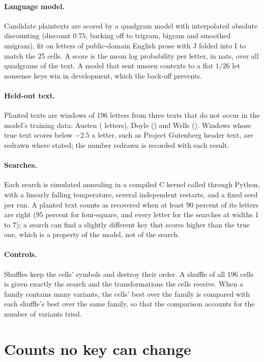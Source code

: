\documentclass[11pt]{article}
\theoremstyle{definition}
\begin{document}
\paragraph{Language model.} Candidate plaintexts are scored by a quadgram model with interpolated absolute discounting \cite{ney1994} (discount $0.75$, backing off to trigram, bigram and smoothed unigram), fit on \corpusLetters{} letters of public-domain English prose with J folded into I to match the 25 cells. A score is the mean log probability per letter, in nats, over all quadgrams of the text. A model that sent unseen contexts to a flat $1/26$ let nonsense keys win in development, which the back-off prevents.

\paragraph{Held-out text.} Planted texts are windows of 196 letters from three texts that do not occur in the model's training data: Austen (\heldAusten{} letters), Doyle (\heldDoyle{}) and Wells (\heldWells{}). Windows whose true text scores below $-2.5$ a letter, such as Project Gutenberg header text, are redrawn where stated; the number redrawn is recorded with each result.

\paragraph{Searches.} Each search is simulated annealing \cite{kirkpatrick1983} in a compiled C kernel called through Python, with a linearly falling temperature, several independent restarts, and a fixed seed per run. A planted text counts as recovered when at least 90 percent of its letters are right (95 percent for four-square, and every letter for the searches at widths 1 to 7); a search can find a slightly different key that scores higher than the true one, which is a property of the model, not of the search.

\paragraph{Controls.} Shuffles keep the cells' symbols and destroy their order. A shuffle of all 196 cells is given exactly the search and the transformations the cells receive. When a family contains many variants, the cells' best over the family is compared with each shuffle's best over the same family, so that the comparison accounts for the number of variants tried.

\section{Counts no key can change}\label{sec:counts}
\end{document}
